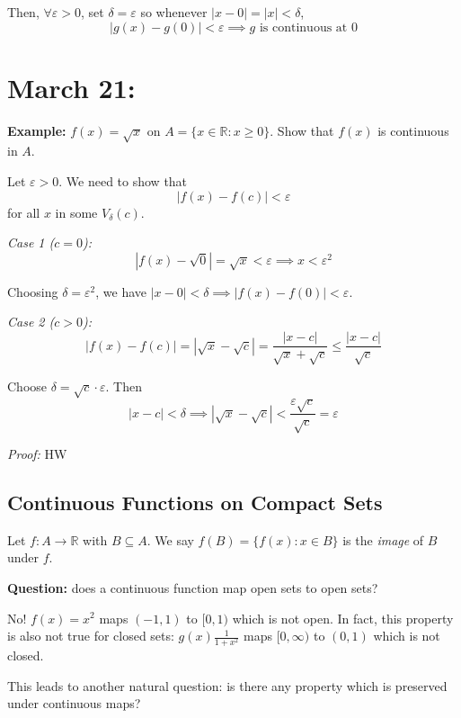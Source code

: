 \documentclass[12pt]{report}
\newcommand{\R}{\mathbb{R}}
\newcommand{\abs}[1]{\left\vert #1 \right\vert}
\newcommand{\ep}{\varepsilon}
\newenvironment*{tbox}[2][gray]{
    \begin{tcolorbox}[
        parbox=false,
        colback=#1!5!white,
        colframe=#1!75!black,
        breakable,
        title={#2}
    ]}
    {\end{tcolorbox}}
\begin{document}
    Then, $\forall \ep > 0$, set $\delta = \ep$ so whenever $\abs{x - 0} = \abs{x} < \delta$, 
    \[\abs{g(x) - g(0)} < \ep \implies g \text{ is continuous at 0}\]

\section{March 21:} 
    \textbf{Example:} $f(x) = \sqrt{x}$ on $A = \{x \in \R: x \geq 0\}$. Show that $f(x)$ is continuous in $A$. 

    Let $\ep > 0$. We need to show that 
    \[\abs{f(x) - f(c)} < \ep\]
    for all $x$ in some $V_{\delta}(c)$.

    \emph{Case 1 ($c = 0$):} 
    \[\abs{f(x) - \sqrt{0}} = \sqrt{x} < \ep \implies x < \ep^2\]

    Choosing $\delta = \ep^2$, we have $\abs{x - 0} < \delta \implies \abs{f(x) - f(0)} < \ep$.

    \emph{Case 2 ($c > 0$):}
    \[\abs{f(x) - f(c)} = \abs{\sqrt{x} - \sqrt{c}} = \frac{\abs{x - c}}{\sqrt{x} + \sqrt{c}} \leq \frac{\abs{x - c}}{\sqrt{c}}\]

    Choose $\delta = \sqrt{c} \cdot \ep$. Then 
    \[\abs{x - c} < \delta \implies \abs{\sqrt{x} - \sqrt{c}} < \frac{\ep\sqrt{c}}{\sqrt{c}} = \ep\]

    \begin{tbox}{\textbf{Theorem (Composition of Continuous Functions):} Given $f: A \to \R$ and $g: B \to \R$ with $f(A) \subseteq B$, if $f$ is continuous at $c \in A$ and $g$ is continuous at $f(c) \in B$, then $g \circ f$ is continuous at $c$. }
        \emph{Proof:} HW
    \end{tbox}

    \subsection*{Continuous Functions on Compact Sets} 
        Let $f: A \to \R$ with $B \subseteq A$. We say $f(B) = \{f(x): x \in B\}$ is the \emph{image} of $B$ under $f$.

        \textbf{Question:} does a continuous function map open sets to open sets? 

        No! $f(x) = x^2$ maps $(-1, 1)$ to $[0, 1)$ which is not open. In fact, this property is also not true for closed sets: $g(x)  \frac{1}{1 + x^2}$ maps $[0, \infty)$ to $(0, 1)$ which is not closed. 

        This leads to another natural question: is there any property which is preserved under continuous maps? 
\end{document}
